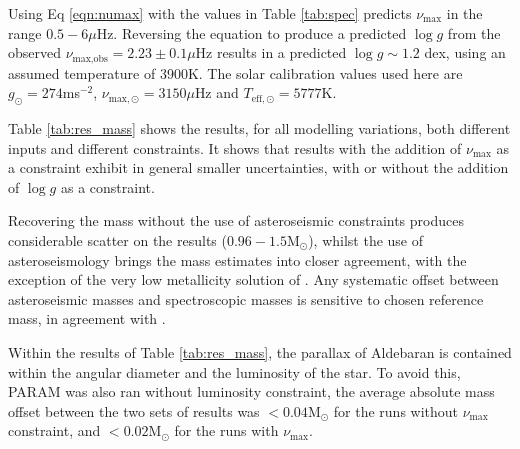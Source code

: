\documentclass[modern]{aastex61}
\begin{document}
Using Eq \ref{eqn:numax} with the values in Table \ref{tab:spec} predicts $\nu_{\textrm{max}}$ in the range $0.5-6\mu$Hz. Reversing the equation to produce a predicted $\log{g}$ from the observed $\nu_{\textrm{max,obs}}=2.23\pm0.1\mu$Hz results in a predicted $\log{g}\sim1.2$ dex, using an assumed temperature of 3900K. The solar calibration values used here are $g_{\odot}=274$ms$^{-2}$, $\nu_{\textrm{max},\odot}=3150\mu$Hz and $T_{\textrm{eff},\odot}=5777$K.

Table \ref{tab:res_mass} shows the results, for all modelling variations, both different inputs and different constraints. It shows that results with the addition of $\nu_{\textrm{max}}$ as a constraint exhibit in general smaller uncertainties, with or without the addition of $\log{g}$ as a constraint.

Recovering the mass without the use of asteroseismic constraints produces considerable scatter on the results ($0.96-1.5\textrm{M}_{\odot}$), whilst the use of asteroseismology brings the mass estimates into closer agreement, with the exception of the very low metallicity solution of \cite{2008Massarotti}. Any systematic offset between asteroseismic masses and spectroscopic masses is sensitive to chosen reference mass, in agreement with \cite{2017North}.

Within the results of Table \ref{tab:res_mass}, the parallax of Aldebaran is contained within the angular diameter and the luminosity of the star. To avoid this, \textsc{PARAM} was also ran without luminosity constraint, the average absolute mass offset between the two sets of results was $<0.04\textrm{M}_{\odot}$ for the runs without $\nu_{\textrm{max}}$ constraint, and $<0.02\textrm{M}_{\odot}$ for the runs with $\nu_{\textrm{max}}$.
\end{document}
